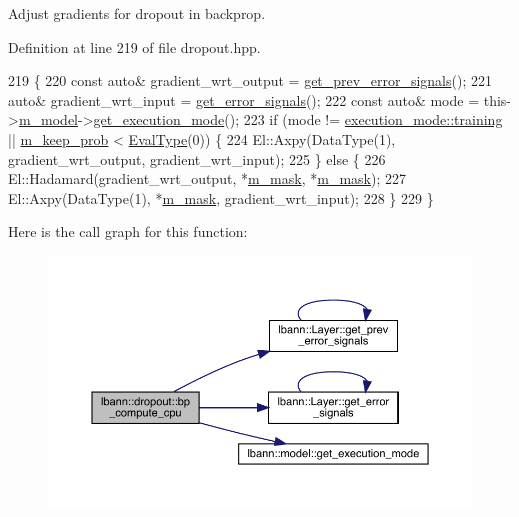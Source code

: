Adjust gradients for dropout in backprop. 

Definition at line 219 of file dropout.\+hpp.


\begin{DoxyCode}
219                         \{
220     \textcolor{keyword}{const} \textcolor{keyword}{auto}& gradient\_wrt\_output = \hyperlink{classlbann_1_1Layer_a7ac4579d3c1671dfaf86e3b618d6938a}{get\_prev\_error\_signals}();
221     \textcolor{keyword}{auto}& gradient\_wrt\_input = \hyperlink{classlbann_1_1Layer_adb561e140e0bb601f3c5a8ee053a71d2}{get\_error\_signals}();
222     \textcolor{keyword}{const} \textcolor{keyword}{auto}& mode = this->\hyperlink{classlbann_1_1Layer_a3d9315e99574166f2f33e37b572021d2}{m\_model}->\hyperlink{classlbann_1_1model_addb40597cf29aa6d31b6a7d09ef48608}{get\_execution\_mode}();
223     \textcolor{keywordflow}{if} (mode != \hyperlink{base_8hpp_a2781a159088df64ed7d47cc91c4dc0a8ac185ddac8b5a8f5aa23c5b80bc12d214}{execution\_mode::training} || \hyperlink{classlbann_1_1dropout_aa06cbee70f3426b589990889b8ac8872}{m\_keep\_prob} < 
      \hyperlink{base_8hpp_a3266f5ac18504bbadea983c109566867}{EvalType}(0)) \{
224       El::Axpy(DataType(1), gradient\_wrt\_output, gradient\_wrt\_input);
225     \} \textcolor{keywordflow}{else} \{
226       El::Hadamard(gradient\_wrt\_output, *\hyperlink{classlbann_1_1dropout_ad7d359957d41adcb64e6e3a2d4ad278d}{m\_mask}, *\hyperlink{classlbann_1_1dropout_ad7d359957d41adcb64e6e3a2d4ad278d}{m\_mask});
227       El::Axpy(DataType(1), *\hyperlink{classlbann_1_1dropout_ad7d359957d41adcb64e6e3a2d4ad278d}{m\_mask}, gradient\_wrt\_input);
228     \}
229   \}
\end{DoxyCode}
Here is the call graph for this function\+:\nopagebreak
\begin{figure}[H]
\begin{center}
\leavevmode
\includegraphics[width=350pt]{classlbann_1_1dropout_aca0160de0c3db5c29a0c4c6bddd0cf4f_cgraph}
\end{center}
\end{figure}
